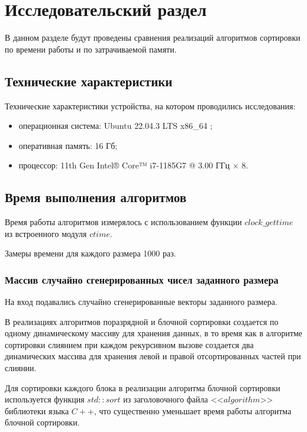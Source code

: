 \chapter{Исследовательский раздел}

В данном разделе будут проведены сравнения реализаций алгоритмов сортировки  по времени работы и по затрачиваемой памяти.

\section{Технические характеристики}

Технические характеристики устройства, на котором проводились исследования: 

\begin{itemize}[label=--]
	\item операционная система: Ubuntu 22.04.3 LTS x86\_64 \cite{os};
	\item оперативная память: 16 Гб;
	\item процессор: 11th Gen Intel® Core™ i7-1185G7 @ 3.00 ГГц × 8.
\end{itemize}

\section{Время выполнения алгоритмов}

Время работы алгоритмов измерялось с использованием функции $clock\_gettime$ из встроенного модуля $ctime$. 

Замеры времени для каждого размера 1000 раз.

\subsection{Массив случайно сгенерированных чисел заданного размера}

На вход подавались случайно сгенерированные векторы заданного размера.

В реализациях алгоритмов поразрядной и блочной сортировки создается по одному динамическому массиву для хранения данных, в то время как в алгоритме сортировки слиянием при каждом рекурсивном вызове создается два динамических массива для хранения левой и правой отсортированных частей при слиянии. 

Для сортировки каждого блока в реализации алгоритма блочной сортировки используется функция $std::sort$ из заголовочного файла <<$algorithm$>> библиотеки языка $C++$, что существенно уменьшает время работы алгоритма блочной сортировки.

